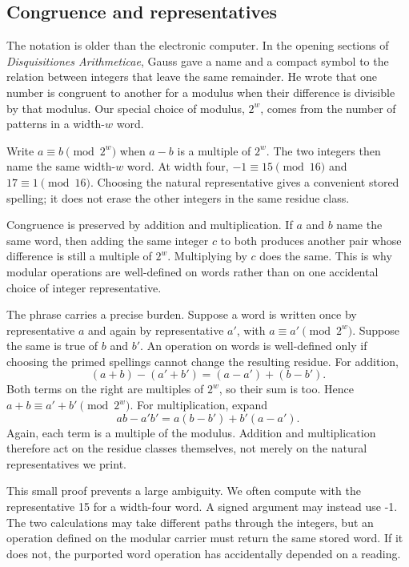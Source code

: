 \subsection{Congruence and representatives}

The notation is older than the electronic computer. In the opening sections
of \emph{Disquisitiones Arithmeticae}, Gauss gave a name and a compact symbol
to the relation between integers that leave the same remainder. He wrote that
one number is congruent to another for a modulus when their
difference is divisible by that modulus.\autocite{gauss1801disquisitiones}
Our special choice of modulus, \(2^w\), comes from the number of patterns in a
width-\(w\) word.

Write \(a\equiv b\pmod{2^w}\) when \(a-b\) is a multiple of \(2^w\). The two
integers then name the same width-\(w\) word. At width four,
\(-1\equiv15\pmod{16}\) and \(17\equiv1\pmod{16}\). Choosing the natural
representative gives a convenient stored spelling; it does not erase the
other integers in the same residue class.

Congruence is preserved by addition and multiplication. If \(a\) and \(b\)
name the same word, then adding the same integer \(c\) to both produces
another pair whose difference is still a multiple of \(2^w\). Multiplying by
\(c\) does the same. This is why modular operations are well-defined on words
rather than on one accidental choice of integer representative.

The phrase  carries a precise burden. Suppose a word is
written once by representative \(a\) and again by representative \(a'\), with
\(a\equiv a'\pmod{2^w}\). Suppose the same is true of \(b\) and \(b'\). An
operation on words is well-defined only if choosing the primed spellings
cannot change the resulting residue. For addition,
\[
  (a+b)-(a'+b')=(a-a')+(b-b').
\]
Both terms on the right are multiples of \(2^w\), so their sum is too. Hence
\(a+b\equiv a'+b'\pmod{2^w}\). For multiplication, expand
\[
  ab-a'b'=a(b-b')+b'(a-a').
\]
Again, each term is a multiple of the modulus. Addition and multiplication
therefore act on the residue classes themselves, not merely on the natural
representatives we print.

This small proof prevents a large ambiguity. We often compute with the
representative 15 for a width-four word. A signed argument may instead use
-1. The two calculations may take different paths through the integers, but
an operation defined on the modular carrier must return the same stored word.
If it does not, the purported word operation has accidentally depended on a
reading.

